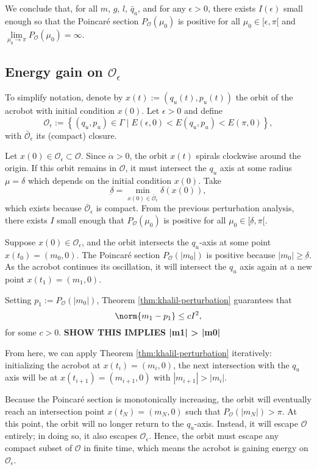 We conclude that, for all \(m\), \(g\), \(l\), \(\bar{q}_a\), and for
any \(\epsilon > 0\), there exists \(I(\epsilon)\) small enough so that
the Poincar\'{e} section \(P_\mathcal{O}(\mu_0)\) is positive for all
\(\mu_0 \in [\epsilon,\pi[\) and 
\(\lim \limits_{\mu_0 \to \pi} P_\mathcal{O}(\mu_0) = \infty\).

\subsection*{Energy gain on \(\mathcal{O}_\epsilon\)}
To simplify notation, denote by \(x(t) := (q_u(t),p_u(t))\) the orbit of the
acrobot with initial condition \(x(0)\).
Let \(\epsilon > 0\) and define
\[
    \mathcal{O}_\epsilon := \left\{(q_u,p_u) \in \Gamma
    \mid E(\epsilon,0) < E(q_u,p_u) < E(\pi,0)\right\}
    ,
\]
with \(\bar{\mathcal{O}}_\epsilon\) its (compact) closure.

Let \(x(0) \in \mathcal{O}_\epsilon \subset \mathcal{O}\).
Since \(\dot{\alpha} > 0\), the orbit \(x(t)\) spirals clockwise around
the origin.
If this orbit remains in \(\mathcal{O}\), it must intersect
the \(q_u\) axis at some radius \(\mu = \delta\)
which depends on the initial condition \(x(0)\).
Take 
\[
    \underbar{\delta} = 
    \min\limits_{x(0) \in \bar{\mathcal{O}}_\epsilon} \delta(x(0))
    ,
\] 
which exists because \(\bar{\mathcal{O}}_\epsilon\) is compact.
From the previous perturbation analysis,
there exists \(I\) small enough that \(P_\mathcal{O}(\mu_0)\) 
is positive for all \(\mu_0 \in [\underbar{\delta},\pi[\).

Suppose \(x(0) \in \mathcal{O}_\epsilon\), and the orbit
intersects the \(q_u\)-axis at some point \(x(t_0) = (m_0, 0)\).
The Poincar\'{e} section \(P_\mathcal{O}(|m_0|)\) is positive because 
\(|m_0| \geq \underbar{\delta}\).
As the acrobot continues its oscillation, it will intersect the \(q_u\) axis
again at a new point \(x(t_1) = (m_1,0)\).

Setting \(p_1 := P_\mathcal{O}(|m_0|)\),
Theorem \ref{thm:khalil-perturbation} guarantees that
\[
    \norm{m_1 - p_1} \leq cI^2
    ,
\]
for some \(c > 0\).
\textbf{SHOW THIS IMPLIES |m1| > |m0|}

From here, we can apply Theorem \ref{thm:khalil-perturbation} iteratively:
initializing the acrobot at \(x(t_i) = (m_i, 0)\), the
next intersection with the \(q_u\) axis will be at
\(x(t_{i+1}) = (m_{i+1},0)\) with \(|m_{i+1}| > |m_i|\).

Because the Poincar\'{e} section is monotonically increasing, 
the orbit will eventually reach an intersection point \(x(t_N) = (m_N,0)\)
such that \(P_\mathcal{O}(|m_N|) > \pi\). 
At this point, the orbit will no longer return to the
\(q_u\)-axis.
Instead, it will escape \(\mathcal{O}\) entirely; 
in doing so, it also escapes \(\mathcal{O}_\epsilon\).
Hence, the orbit must escape any compact subset of \(\mathcal{O}\) in finite
time, which means the acrobot is gaining energy on \(\mathcal{O}_\epsilon\).

